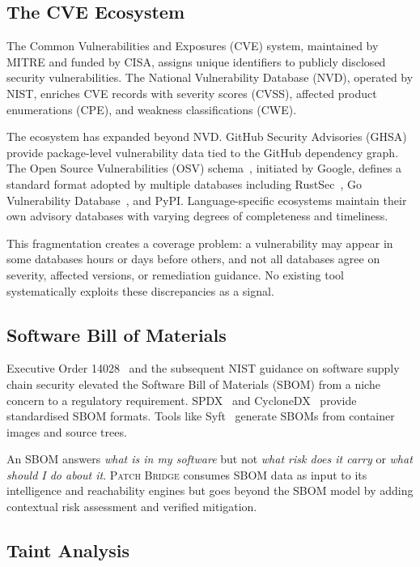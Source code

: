 \documentclass[11pt,twocolumn]{article}
\begin{document}
\subsection{The CVE Ecosystem}
\label{sec:bg-cve}

The Common Vulnerabilities and Exposures (CVE) system, maintained by
MITRE and funded by CISA, assigns unique identifiers to publicly
disclosed security vulnerabilities. The National Vulnerability Database
(NVD), operated by NIST, enriches CVE records with severity scores
(CVSS), affected product enumerations (CPE), and weakness
classifications (CWE).

The ecosystem has expanded beyond NVD. GitHub Security Advisories (GHSA)
provide package-level vulnerability data tied to the GitHub dependency
graph. The Open Source Vulnerabilities (OSV) schema~\cite{osv-schema},
initiated by Google, defines a standard format adopted by multiple
databases including RustSec~\cite{rustsec}, Go Vulnerability
Database~\cite{go-vulndb}, and PyPI. Language-specific ecosystems
maintain their own advisory databases with varying degrees of
completeness and timeliness.

This fragmentation creates a coverage problem: a vulnerability may
appear in some databases hours or days before others, and not all
databases agree on severity, affected versions, or remediation guidance.
No existing tool systematically exploits these discrepancies as a signal.

\subsection{Software Bill of Materials}
\label{sec:bg-sbom}

Executive Order 14028~\cite{eo14028} and the subsequent NIST guidance
on software supply chain security elevated the Software Bill of
Materials (SBOM) from a niche concern to a regulatory requirement.
SPDX~\cite{spdx} and CycloneDX~\cite{cyclonedx} provide standardised
SBOM formats. Tools like Syft~\cite{syft} generate SBOMs from container
images and source trees.

An SBOM answers \emph{what is in my software} but not \emph{what
risk does it carry} or \emph{what should I do about it}. \textsc{Patch
Bridge} consumes SBOM data as input to its intelligence and reachability
engines but goes beyond the SBOM model by adding contextual risk
assessment and verified mitigation.

\subsection{Taint Analysis}
\label{sec:bg-taint}
\end{document}
